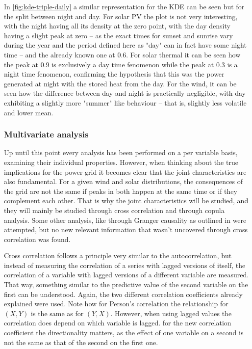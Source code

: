 In \autoref{fig:kde-triple-daily} a similar representation for the KDE can be seen but for the split between night and day. For solar PV the plot is not very interesting, with the night having all its density at the zero point, with the day density having a slight peak at zero -- as the exact times for sunset and sunrise vary during the year and the period defined here as "day" can in fact have some night time -- and the already known one at 0.6. For solar thermal it can be seen how the peak at 0.9 is exclusively a day time fenomenon while the peak at 0.3 is a night time fenomenon, confirming the hypothesis that this was the power generated at night with the stored heat from the day. For the wind, it can be seen how the difference between day and night is practically negligible, with day exhibiting a slightly more "summer" like behaviour -- that is, slightly less volatile and lower mean. 

\subsubsection{Multivariate analysis}
Up until this point every analysis has been performed on a per variable basis, examining their individual properties. However, when thinking about the true implications for the power grid it becomes clear that the joint characteristics are also fundamental. For a given wind and solar distributions, the consequences of the grid are not the same if peaks in both happen at the same time or if they complement each other. That is why the joint characteristics will be studied, and they will mainly be studied through cross correlation and through copula analysis. Some other analysis, like through Granger causality as outlined in \cite{granger_1969} were attempted, but no new relevant information that wasn't uncovered through cross correlation was found. 

Cross correlation follows a principle very similar to the autocorrelation, but instead of measuring the correlation of a series with lagged versions of itself, the correlation of a variable with lagged versions of a different variable are measured. That way, something similar to the predictive value of the second variable on the first can be understood. Again, the two different correlation coefficients already explained were used. Note how for Person's correlation the relationship for $\left(X,Y\right)$ is the same as for $\left(Y,X\right)$. However, when using lagged values the correlation does depend on which variable is lagged. for the new correlation coefficient the directionality matters, as the effect of one variable on a second is not the same as that of the second on the first one. 

